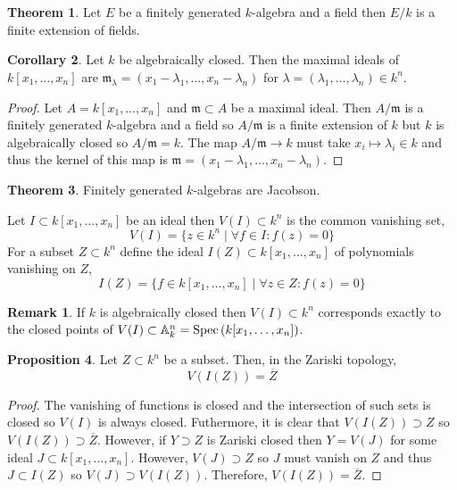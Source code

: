 \documentclass[12pt]{extarticle}
\theoremstyle{definition}
\newtheorem{theorem}{Theorem}[section]
\newtheorem{proposition}[theorem]{Proposition}
\newtheorem{corollary}[theorem]{Corollary}
\newtheorem{remark}{Remark}
\newenvironment{definition}[1][Definition:]{\begin{trivlist}
\item[\hskip \labelsep {\bfseries #1}]}{\end{trivlist}}
\newcommand{\m}{\mathfrak{m}}
\newcommand{\A}{\mathbb{A}}
\begin{document}
\begin{theorem}
Let $E$ be a finitely generated $k$-algebra and a field then $E / k$ is a finite extension of fields.
\end{theorem}

\begin{corollary}
Let $k$ be algebraically closed. Then the maximal ideals of $k[x_1, \dots, x_n]$ are $\m_\lambda = (x_1 - \lambda_1, \dots, x_n - \lambda_n)$ for $\lambda = (\lambda_1, \dots, \lambda_n) \in k^n$.
\end{corollary}

\begin{proof}
Let $A = k[x_1, \dots, x_n]$ and $\m \subset A$ be a maximal ideal. Then $A / \m$ is a finitely generated $k$-algebra and a field so $A / \m$ is a finite extension of $k$ but $k$ is algebraically closed so $A / \m = k$. The map $A / \m \to k$ must take $x_i \mapsto \lambda_i \in k$ and thus the kernel of this map is $\m = (x_1 - \lambda_1, \dots, x_n - \lambda_n)$. 
\end{proof}

\begin{theorem}
Finitely generated $k$-algebras are Jacobson.
\end{theorem}

\begin{definition}
Let $I \subset k[x_1, \dots, x_n]$ be an ideal then $V(I) \subset k^n$ is the common vanishing set,
\[ V(I) = \{ z \in k^n \mid \forall f \in I : f(z) = 0 \} \]
For a subset $Z \subset k^n$ define the ideal $I(Z) \subset k[x_1, \dots, x_n]$ of polynomials vanishing on $Z$,
\[ I(Z) = \{ f \in k[x_1, \dots, x_n] \mid \forall z \in Z : f(z) = 0 \} \]
\end{definition}

\begin{remark}
If $k$ is algebraically closed then $V(I) \subset k^n$ corresponds exactly to the closed points of $V(I) \subset \A^n_k = \Spec{k[x_1, \dots, x_n]}$. 
\end{remark}

\begin{proposition}
Let $Z \subset k^n$ be a subset. Then, in the Zariski topology,
\[ V(I(Z)) = \overline{Z} \]
\end{proposition}

\begin{proof}
The vanishing of functions is closed and the intersection of such sets is closed so $V(I)$ is always closed. Futhermore, it is clear that $V(I(Z)) \supset Z$ so $V(I(Z)) \supset \overline{Z}$. However, if $Y \supset Z$ is Zariski closed then $Y = V(J)$ for some ideal $J \subset k[x_1, \dots, x_n]$. However, $V(J) \supset Z$ so $J$ must vanish on $Z$ and thus $J \subset I(Z)$ so $V(J) \supset V(I(Z))$. Therefore, $V(I(Z)) = \overline{Z}$. 
\end{proof}
\end{document}
